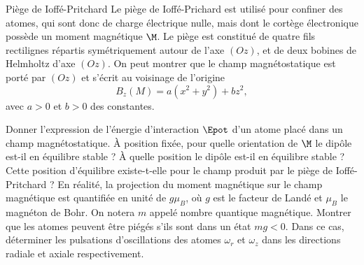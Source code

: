 \begin{exo}[PC][1][TD]{Piège de Ioffé-Pritchard}
Le piège de Ioffé-Prichard est utilisé pour confiner des atomes, qui sont donc de charge électrique nulle, mais dont le cortège électronique possède un moment magnétique $\M$. Le piège est constitué de quatre fils rectilignes répartis symétriquement autour de l'axe $(Oz)$,
et de deux bobines de Helmholtz d'axe $(Oz)$. On peut montrer que le champ magnétostatique  est porté par $(Oz)$ et s'écrit au voisinage de l'origine 
\begin{equation}
	B_z(M) =  a (x^2+y^2) + b z^2,
\end{equation}
avec $a>0$ et $b>0$ des constantes.

\begin{quest}
	\question Donner l'expression de l'énergie d'interaction $\Epot$ d'un atome placé dans un champ magnétostatique. À position fixée, pour quelle orientation de $\M$ le dipôle est-il en équilibre stable ? À quelle position le dipôle est-il en équilibre stable ? Cette position d'équilibre existe-t-elle pour le champ produit par le piège de Ioffé-Pritchard ?
	\question En réalité, la projection du moment magnétique sur le champ magnétique est quantifiée en unité de $g \mu_B$, où $g$ est le facteur de Landé et $\mu_B$ le magnéton de Bohr. On notera $m$ appelé nombre quantique magnétique. Montrer que les atomes peuvent être piégés s'ils sont dans un état $mg<0$.
	\question Dans ce cas, déterminer les pulsations d'oscillations des atomes $\omega_r$ et $\omega_z$ dans les directions radiale et axiale respectivement.
\end{quest}

\end{exo}

